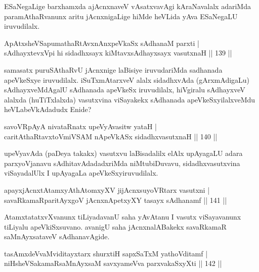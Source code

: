 \begin{artha}
ESaNegaLige barxhamxda ajAcnxnaveV vAsatxvavAgi kAraNavalalx adariMda paramAthaRvanunx aritu jAcnxnigaLige hiMde heVLida yAva ESaNegaLU iruvudilalx.
\end{artha}

\begin{shl}
ApAtxsheVSapumathaRtAvxnAnxpeVkaSx sAdhanaM parxti |\\
sAdhayxtevxV\s pi hi sidadhxsayx kiMtavxsAdhayxsayx vasutxnaH \hfill || 139 ||
\end{shl}

\begin{artha}
samasatx puruSAthaRvU jAcnxnige laBisiye iruvudariMda sadhanada apeVkeSxye iruvudilalx. iSuTxmAtarxveV alalx sidadhxvAda (gArxmAdigaLu) sAdhayxveMdAgalU sAdhanada apeVkeSx iruvudilalx, hiVgiralu sAdhayxveV alalxda (huTiTxlalxda) vasutxvina viSayakekx sAdhanada apeVkeSxyilalxveMdu heVLabeVkAdadudx Enide? 
\end{artha}

\begin{shl}
savoVRpAyA nivataRnatx upeVyAvasitw yataH |\\
caritAthaRtavxtoV\s miVSAM nApeVkASx sidadhxvasutxnaH \hfill || 140 ||
\end{shl}

\begin{artha}
upeVyavAda (paDeya takakx) vasutxvu laBisadalilx elAlx upAyagaLU adara parxyoVjanavu sAdhitavAdadadxriMda niMtubiDuvavu, sidadhxvasutxvina viSayadalUlx I upAyagaLa apeVkeSxyiruvudilalx.
\end{artha}%


\begin{shl}
apayxjAcnxtAtamxyAthAtomxyXV jijAcnxsuyoVR\s tarx vasutxni |\\
savaRkamaRparitAyxgoV jAcnxnApetxyXY tasayx sAdhanamf \hfill || 141 ||
\end{shl}

\begin{artha}
AtamxtatatxvXvanunx tiLiyadavanU saha yAvAtanu I vasutx viSayavanunx tiLiyalu apeVkiSxsuvano. avanigU saha jAcnxnalABakekx savaRkamaR saMnAyxsataveV sAdhanavAgide.
\end{artha}

\begin{shl}
tasAmxdeVvaMviditayxtarx shurxtiH sapxSaTxM yathoVditamf |\\
niHsheVSakamaRsaMnAyxsaM savxyameVva parxvakaSxyXti \hfill || 142 ||
\end{shl}

